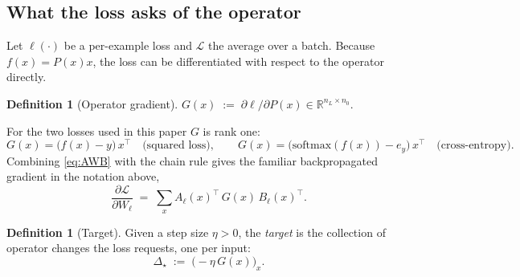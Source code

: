 \documentclass{article} %
\theoremstyle{plain}
\theoremstyle{definition}
\newtheorem{definition}[theorem]{Definition}
\theoremstyle{remark}
\begin{document}
\subsection{What the loss asks of the operator}
\label{sec:target}

Let $\ell(\cdot)$ be a per-example loss and $\mathcal{L}$ the average over a batch. Because
$f(x) = P(x)x$, the loss can be differentiated with respect to the operator directly.

\begin{definition}[Operator gradient]
$G(x) \;:=\; \partial \ell / \partial P(x) \in \mathbb{R}^{n_L \times n_0}$.
\end{definition}

For the two losses used in this paper $G$ is rank one:
\begin{equation}
  G(x) = \big(f(x) - y\big)\,x^\top \quad\text{(squared loss)},
  \qquad
  G(x) = \big(\mathrm{softmax}(f(x)) - e_y\big)\,x^\top \quad\text{(cross-entropy)} .
  \label{eq:G}
\end{equation}
Combining \eqref{eq:AWB} with the chain rule gives the familiar backpropagated gradient in the
notation above,
\begin{equation}
  \frac{\partial \mathcal{L}}{\partial W_\ell}
  \;=\; \sum_x A_\ell(x)^\top\, G(x)\, B_\ell(x)^\top .
  \label{eq:backprop}
\end{equation}

\begin{definition}[Target]
Given a step size $\eta > 0$, the \emph{target} is the collection of operator changes the loss
requests, one per input:
\begin{equation}
  \Delta_\star \;:=\; \big(-\eta\, G(x)\big)_x .
  \label{eq:target}
\end{equation}
\end{definition}
\end{document}
